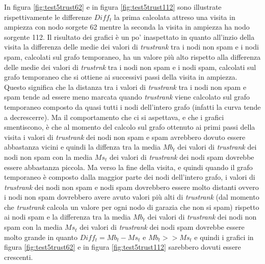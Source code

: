 In figura \ref{fig:test5trust62} e in figura \ref{fig:test5trust112} sono illustrate rispettivamente le differenze \(Diff_t\) la prima calcolata attreso una visita in ampiezza con nodo sorgete 62 mentre la seconda la visita in ampiezza ha nodo sorgente 112. Il risultato dei grafici è un po' inaspettato in quanto all'inzio della visita la differenza delle medie dei valori di \textit{trustrank} tra i nodi non spam e i nodi spam, calcolati sul grafo temporaneo, ha un valore più alto rispetto alla differenza delle medie dei valori di \textit{trustrnk} tra i nodi non spam e i nodi spam, calcolati sul grafo temporaneo che si ottiene ai successivi passi della visita in ampiezza. Questo significa che la distanza tra i valori di \textit{trustrank} tra i nodi non spam e spam tende ad essere meno marcata quando \textit{trustrank} viene calcolato sul grafo temporaneo composto da quasi tutti i nodi dell'intero grafo (infatti la curva tende a decrescerre).
Ma il comportamento che ci si aspettava, e che i grafici smentiscono, è che al momento del calcolo sul grafo ottenuto ai primi passi della visita i valori di \textit{trustrank} dei nodi non spam e spam avrebbero dovuto essere abbastanza vicini e quindi la diffenza tra la media \(Mb_t\) dei valori di \textit{trustrank} dei nodi non spam con la media \(Ms_t\) dei valori di \textit{trustrank} dei nodi spam dovrebbe essere abbastanza piccola. Ma verso la fine della visita, e quindi quando il grafo temporaneo è composto dalla maggior parte dei nodi dell'intero grafo, i valori di \textit{trustrank} dei nodi non spam e nodi spam dovrebbero essere molto distanti ovvero i nodi non spam dovrebbero avere avuto valori più alti di \textit{trustrank} (dal momento che \textit{trustrank} calcola un valore per ogni nodo di garazia che non si spam) rispetto ai nodi spam e la differenza tra la media \(Mb_t\) dei valori di \textit{trustrank} dei nodi non spam con la media \(Ms_t\) dei valori di \textit{trustrank} dei nodi spam 
dovrebbe essere molto grande in quanto \(Diff_t = Mb_t-Ms_t\) e \(Mb_t >> Ms_t\) e quindi i grafici in figura \ref{fig:test5trust62} e in figura \ref{fig:test5trust112} sarebbero dovuti essere crescenti.
